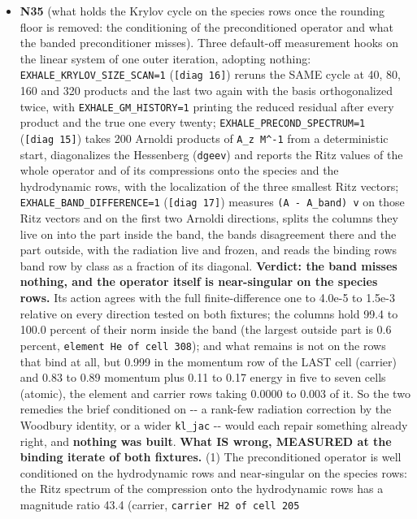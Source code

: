 \documentclass[english,a4paper]{my_memo}
\begin{document}
\begin{itemize}
\item
  \textbf{N35} (what holds the Krylov cycle on the species rows once the
  rounding floor is removed: the conditioning of the preconditioned
  operator and what the banded preconditioner misses). Three default-off
  measurement hooks on the linear system of one outer iteration, adopting
  nothing: \texttt{EXHALE\_KRYLOV\_SIZE\_SCAN=1} (\texttt{{[}diag\ 16{]}}) reruns the SAME cycle
  at 40, 80, 160 and 320 products and the last two again with the basis
  orthogonalized twice, with \texttt{EXHALE\_GM\_HISTORY=1} printing the reduced
  residual after every product and the true one every twenty;
  \texttt{EXHALE\_PRECOND\_SPECTRUM=1} (\texttt{{[}diag\ 15{]}}) takes 200 Arnoldi products of
  \texttt{A\_z\ M\^{}-1} from a deterministic start, diagonalizes the Hessenberg
  (\texttt{dgeev}) and reports the Ritz values of the whole operator and of its
  compressions onto the species and the hydrodynamic rows, with the
  localization of the three smallest Ritz vectors;
  \texttt{EXHALE\_BAND\_DIFFERENCE=1} (\texttt{{[}diag\ 17{]}}) measures \texttt{(A\ -\ A\_band)\ v} on
  those Ritz vectors and on the first two Arnoldi directions, splits the
  columns they live on into the part inside the band, the band\textquotesingle s
  disagreement there and the part outside, with the radiation live and
  frozen, and reads the binding row\textquotesingle s band row by class as a fraction of its
  diagonal. \textbf{Verdict: the band misses nothing, and the operator itself is
  near-singular on the species rows.} Its action agrees with the full
  finite-difference one to 4.0e-5 to 1.5e-3 relative on every direction
  tested on both fixtures; the columns hold 99.4 to 100.0 percent of their
  norm inside the band (the largest outside part is 0.6 percent, \texttt{element\ He\ of\ cell\ 308}); and what remains is not on the rows that bind at all,
  but 0.999 in the momentum row of the LAST cell (carrier) and 0.83 to
  0.89 momentum plus 0.11 to 0.17 energy in five to seven cells (atomic),
  the element and carrier rows taking 0.0000 to 0.003 of it. So the two
  remedies the brief conditioned on -\/- a rank-few radiation correction by
  the Woodbury identity, or a wider \texttt{kl\_jac} -\/- would each repair something
  already right, and \textbf{nothing was built}. \textbf{What IS wrong, MEASURED at
  the binding iterate of both fixtures.} (1) The preconditioned operator
  is well conditioned on the hydrodynamic rows and near-singular on the
  species rows: the Ritz spectrum of the compression onto the hydrodynamic
  rows has a magnitude ratio 43.4 (carrier, \texttt{carrier\ H2\ of\ cell\ 205}

\end{itemize}
\end{document}
